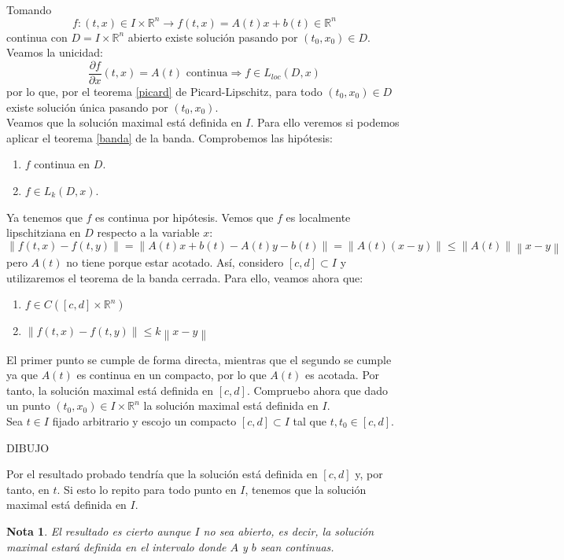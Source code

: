 \documentclass[11pt]{article}
\makeatletter
\theoremstyle{theorem-style}  %
\renewenvironment{proof}[1][\proofname]{\par
	\pushQED{\qed}%
	\normalfont \topsep6\p@\@plus6\p@\relax
	\list{}{%
		\settowidth{\leftmargin}{\quad:\hskip\labelsep}%
		\setlength{\labelwidth}{0pt}%
		\setlength{\itemindent}{-\leftmargin}%
	}%
	\item[\hskip\labelsep\itshape#1\@addpunct{:}]\ignorespaces
}{%
	\popQED\endlist\@endpefalse
}
\theoremstyle{definition-style}
\newtheorem*{note}{Nota} %
\theoremstyle{example-style}
\providecommand{\norm}[1]{\left\lVert#1\right\rVert} %
\makeatother
\begin{document}
\begin{proof}\ \\
	Tomando
	\[f:(t, x) \in I \times \mathbb{R}^n \longrightarrow f(t,x)=A(t)x+b(t)\in\mathbb{R}^n\]
	continua con $D = I \times \mathbb{R}^n$ abierto existe solución pasando por $(t_0, x_0) \in D$. Veamos la unicidad:
	\[\frac{\partial f}{\partial x} (t, x) = A(t) \text{ continua} \Rightarrow f \in L_{loc} (D, x)\]
	por lo que, por el teorema \ref{picard} de Picard-Lipschitz, para todo $ (t_0, x_0) \in D$ existe solución única pasando por $(t_0, x_0)$. \\
	Veamos que la solución maximal está definida en $I$. Para ello veremos si podemos aplicar el teorema \ref{banda} de la banda. Comprobemos las hipótesis:
	\begin{enumerate}
		\item $f$ continua en $D$.
		\item $f \in L_k (D, x)$.
	\end{enumerate}
	Ya tenemos que $f$ es continua por hipótesis. Vemos que $f$ es localmente lipschitziana en $D$ respecto a la variable $x$:
	\[\norm{f(t, x) - f(t, y)} = \norm{A(t)x + b(t) - A(t)y - b(t)} = \norm{A(t) (x-y)} \leq \norm{A(t)} \norm{x - y} \]
	pero $A(t)$ no tiene porque estar acotado. Así, considero $[c, d] \subset I$ y utilizaremos el teorema de la banda cerrada. Para ello, veamos ahora que:
	\begin{enumerate}
		\item $f \in C([c, d] \times \mathbb{R}^n)$
		\item $\norm{f(t, x) - f(t, y)} \leq k \norm{x - y}$
	\end{enumerate}
	El primer punto se cumple de forma directa, mientras que el segundo se cumple ya que $A(t)$ es continua en un compacto, por lo que $A(t)$ es acotada. Por tanto, la solución maximal está definida en $[c, d]$. Compruebo ahora que dado un punto $(t_0, x_0) \in I \times \mathbb{R}^n$ la solución maximal está definida en $I$. \\
	Sea $t \in I$ fijado arbitrario y escojo un compacto $[c, d]\subset I$ tal que $t, t_0 \in [c, d]$. \\
	\begin{center}
		DIBUJO
	\end{center}
	Por el resultado probado tendría que la solución está definida en $[c, d]$ y, por tanto, en $t$. Si esto lo repito para todo punto en $I$, tenemos que la solución maximal está definida en $I$.
\end{proof}
\begin{note}
	El resultado es cierto aunque $I$ no sea abierto, es decir, la solución maximal estará definida en el intervalo donde $A$ y $b$ sean continuas.
\end{note}
\end{document}
